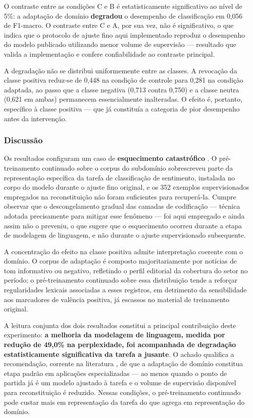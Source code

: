 O contraste entre as condições C e B é estatisticamente significativo ao nível de 5\%: a adaptação
de domínio \textbf{degradou} o desempenho de classificação em 0,056 de F1-macro. O contraste entre
C e A, por sua vez, não é significativo, o que indica que o protocolo de ajuste fino aqui
implementado reproduz o desempenho do modelo publicado utilizando menor volume de supervisão ---
resultado que valida a implementação e confere confiabilidade ao contraste principal.

A degradação não se distribui uniformemente entre as classes. A revocação da classe positiva
reduz-se de 0,448 na condição de controle para 0,281 na condição adaptada, ao passo que a classe
negativa (0,713 contra 0,750) e a classe neutra (0,621 em ambas) permanecem essencialmente
inalteradas. O efeito é, portanto, específico à classe positiva --- que já constituía a categoria
de pior desempenho antes da intervenção.

\subsubsection{Discussão}

Os resultados configuram um caso de \textbf{esquecimento catastrófico} \cite{french_catastrophic_1999}.
O pré-treinamento continuado sobre o corpus do subdomínio sobrescreveu parte da representação
específica da tarefa de classificação de sentimento, instalada no corpo do modelo durante o ajuste
fino original, e os 352 exemplos supervisionados empregados na reconstituição não foram suficientes
para recuperá-la. Cumpre observar que o descongelamento gradual das camadas de codificação
\cite{howard_universal_2018} --- técnica adotada precisamente para mitigar esse fenômeno --- foi
aqui empregado e ainda assim não o preveniu, o que sugere que o esquecimento ocorreu durante a
etapa de modelagem de linguagem, e não durante o ajuste supervisionado subsequente.

A concentração do efeito na classe positiva admite interpretação coerente com o domínio. O corpus
de adaptação é composto majoritariamente por notícias de tom informativo ou negativo, refletindo o
perfil editorial da cobertura do setor no período; o pré-treinamento continuado sobre essa
distribuição tende a reforçar regularidades lexicais associadas a esses registros, em detrimento da
sensibilidade aos marcadores de valência positiva, já escassos no material de treinamento original.

A leitura conjunta dos dois resultados constitui a principal contribuição deste experimento:
\textbf{a melhoria da modelagem de linguagem, medida por redução de 49,0\% na perplexidade, foi
acompanhada de degradação estatisticamente significativa da tarefa a jusante}. O achado qualifica a
recomendação, corrente na literatura \cite{gururangan_dont_2020}, de que a adaptação de domínio
constitua etapa padrão em aplicações especializadas --- ao menos quando o ponto de partida já é um
modelo ajustado à tarefa e o volume de supervisão disponível para reconstituição é reduzido. Nessas
condições, o pré-treinamento continuado pode custar mais em representação da tarefa do que agrega
em representação do domínio.


